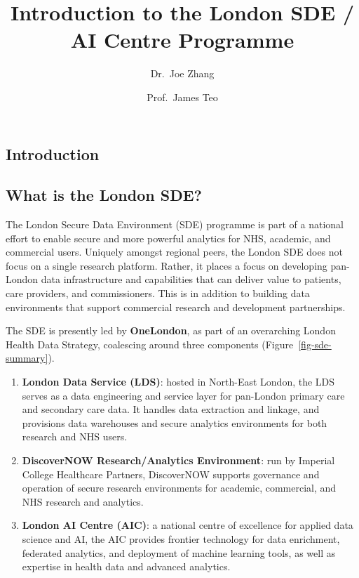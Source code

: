 \documentclass[
  letterpaper,
  DIV=11,
  numbers=noendperiod]{scrartcl}
\title{Introduction to the London SDE / AI Centre Programme}
\author{Dr.~Joe Zhang \and Prof.~James Teo}
\date{}
\begin{document}
\maketitle

\subsection{Introduction}\label{introduction}

\subsection{What is the London SDE?}\label{what-is-the-london-sde}

The London Secure Data Environment (SDE) programme is part of a national
effort to enable secure and more powerful analytics for NHS, academic,
and commercial users. Uniquely amongst regional peers, the London SDE
does not focus on a single research platform. Rather, it places a focus
on developing pan-London data infrastructure and capabilities that can
deliver value to patients, care providers, and commissioners. This is in
addition to building data environments that support commercial research
and development partnerships.

The SDE is presently led by \textbf{OneLondon}, as part of an
overarching London Health Data Strategy, coalescing around three
components (Figure~\ref{fig-sde-summary}).

\begin{enumerate}
\def\labelenumi{(\arabic{enumi})}
\item
  \textbf{London Data Service (LDS)}: hosted in North-East London, the
  LDS serves as a data engineering and service layer for pan-London
  primary care and secondary care data. It handles data extraction and
  linkage, and provisions data warehouses and secure analytics
  environments for both research and NHS users.
\item
  \textbf{DiscoverNOW Research/Analytics Environment}: run by Imperial
  College Healthcare Partners, DiscoverNOW supports governance and
  operation of secure research environments for academic, commercial,
  and NHS research and analytics.
\item
  \textbf{London AI Centre (AIC)}: a national centre of excellence for
  applied data science and AI, the AIC provides frontier technology for
  data enrichment, federated analytics, and deployment of machine
  learning tools, as well as expertise in health data and advanced
  analytics.
\end{enumerate}
\end{document}
